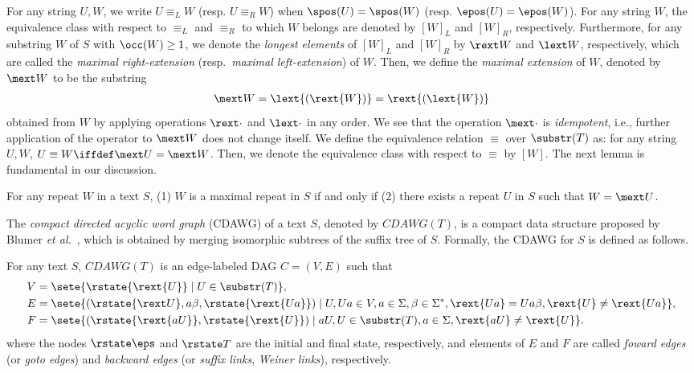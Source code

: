 For any string $U, W$, we write $U \equiv_L W$ (resp. $U \equiv_R W$) when $\spos(U) = \spos(W)$ (resp. $\epos(U) = \epos(W)$). For any string $W$, the equivalence class with respect to $\equiv_L$ and $\equiv_R$ to which $W$ belongs are denoted by $[W]_L$  and $[W]_R$, respectively. Furthermore, for any substring $W$ of $S$ with $\occ(W) \ge 1$, we denote the \textit{longest elements} of $[W]_L$ and $[W]_R$ by $\rext W$ and $\lext W$, respectively, which are called the \textit{maximal right-extension} (resp.~\textit{maximal left-extension}) of $W$. Then, we define the \textit{maximal extension} of $W$, denoted by $\mext W$ to be the substring 
\begin{align*}
  \mext W = \lext{(\rext{W})} = \rext{(\lext{W})}
\end{align*}
obtained from $W$ by applying operations $\rext\cdot$ and $\lext\cdot$ in any order. We see that the operation $\mext\cdot$ is \textit{idempotent}, i.e., further application of the operator to $\mext W$ does not change itself.
We define the equivalence relation $\equiv$ over $\substr(T)$ as: for any string $U, W$, $U \equiv W \iffdef \mext U = \mext W$. Then, we denote the equivalence class with respect to $\equiv$ by $[W]$. The next lemma is fundamental in our discussion. 

\begin{lemma}
  For any repeat $W$ in a text $S$, 
  (1) $W$ is a maximal repeat in $S$ if and only if 
  (2) there exists a repeat $U$ in $S$ such that $W = \mext U$. 
\end{lemma}

The \textit{compact directed acyclic word graph} (CDAWG) of a text $S$, denoted by $CDAWG(T)$, is a compact data structure proposed by Blumer \textit{et al.}~\cite{blumer1987complete}, which is obtained by merging isomorphic subtrees of the suffix tree of $S$. Formally, the CDAWG for $S$ is defined as follows. 

\begin{definition}[CDAWG]
  For any text $S$, $CDAWG(T)$ is an edge-labeled DAG $C = (V, E)$ such that
  \begin{align*}
    V &= \sete{ \rstate{\rext{U}} \mid U \in \substr(T) },  
    \\
    E &=
    \sete{ (\rstate{\rext U}, a\beta, \rstate{\rext{Ua}})
      \mid U, Ua \in V, a \in \Sigma, \beta \in \Sigma^*,
      \rext{Ua} = Ua\beta, \rext{U} \not= \rext{Ua}
    }, 
  \\
  F &= \sete{ (\rstate{\rext{aU}}, \rstate{\rext{U}})
  \mid aU, U \in \substr(T), a \in \Sigma, 
  \rext{aU} \not= \rext{U}
}. 
  \end{align*}
where the nodes $\rstate\eps$ and $\rstate T$ are the initial and final state, respectively, and elements of $E$ and $F$ are called \textit{foward edges} (or \textit{goto edges}) and \textit{backward edges} (or \textit{suffix links}, \textit{Weiner links}), respectively. 
\end{definition}

